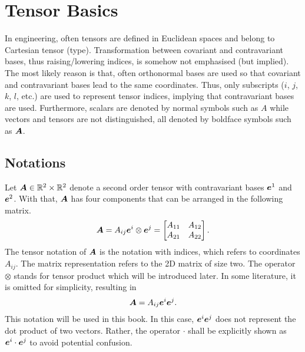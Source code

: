 \chapter{Tensor Basics}
In engineering, often tensors are defined in Euclidean spaces and belong to Cartesian tensor (type). Transformation between covariant and contravariant bases, thus raising/lowering indices, is somehow not emphasised (but implied). The most likely reason is that, often orthonormal bases are used so that covariant and contravariant bases lead to the same coordinates. Thus, only subscripts ($i$, $j$, $k$, $l$, etc.) are used to represent tensor indices, implying that contravariant bases are used. Furthermore, scalars are denoted by normal symbols such as $A$ while vectors and tensors are not distinguished, all denoted by boldface symbols such as $\bm{A}$. 
\section{Notations}
Let $\bm{A}\in\mathbb{R}^2\times\mathbb{R}^2$ denote a second order tensor with contravariant bases $\bm{e}^1$ and $\bm{e}^2$. With that, $\bm{A}$ has four components that can be arranged in the following matrix.
\begin{gather}\label{eq:matrix_tensor}
\bm{A}=A_{ij}\bm{e}^i\otimes\bm{e}^j=\begin{bmatrix}
A_{11}&A_{12}\\
A_{21}&A_{22}
\end{bmatrix}.
\end{gather}
The tensor notation of $\bm{A}$ is the notation with indices, which refers to coordinates $A_{ij}$. The matrix representation refers to the 2D matrix of size two. The operator $\otimes$ stands for tensor product which will be introduced later. In some literature, it is omitted for simplicity, resulting in
\begin{gather}
\bm{A}=A_{ij}\bm{e}^i\bm{e}^j.
\end{gather}
This notation will be used in this book. In this case, $\bm{e}^i\bm{e}^j$ does not represent the dot product of two vectors. Rather, the operator $\cdot$ shall be explicitly shown as $\bm{e}^i\cdot\bm{e}^j$ to avoid potential confusion.

